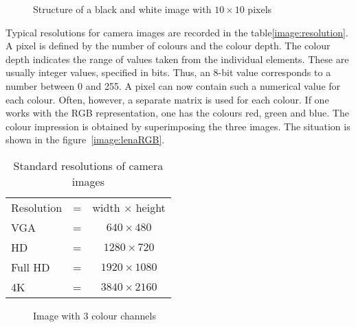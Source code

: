 \begin{figure}
\begin{center}
	\end{center}    
	
	
	\caption{Structure of a black and white image with $10 \times 10$ pixels}\label{img:schwarzweiss}
\end{figure}


Typical resolutions for camera images are recorded in the table\ref{image:resolution}. A pixel is defined by the number of colours and the colour depth. The colour depth indicates the range of values taken from the individual elements. These are usually integer values, specified in bits. Thus, an 8-bit value corresponds to a number between 0 and 255. A pixel can now contain such a numerical value for each colour. Often, however, a separate matrix is used for each colour. If one works with the RGB representation, one has the colours red, green and blue. The colour impression is obtained by superimposing the three images. The situation is shown in the figure~\ref{image:lenaRGB}. 



\begin{table}
	\centering
	\begin{tabular}{lcc}
		Resolution &=& width $\times$ height \\
		VGA             &=& $640 \times 480$ \\
		HD              &=& $1280 \times 720$\\
		Full HD         &=& $1920 \times 1080$\\
		4K               &=& $3840 \times 2160$\\
	\end{tabular}
	\caption{Standard resolutions of camera images}\label{Bild:Aufloesung}  	
\end{table}

\bigskip



\begin{figure}
	\centering
	\caption{Image with 3 colour channels}\label{Bild:lenaRGB}
\end{figure}

